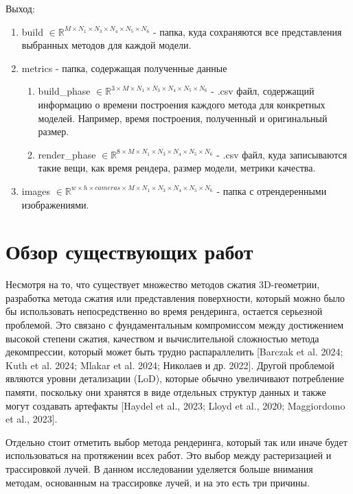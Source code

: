 \documentclass[a4paper,hidelinks,12pt]{article}
\begin{document}
Выход:
\par
\begin{enumerate}
	\item build $\in \mathbb{R}^{M \times N_1 \times N_3 \times N_4 \times N_5 \times N_6}$ - папка, куда сохраняются все представления выбранных методов для каждой модели.
	\item metrics - папка, содержащая полученные данные
	\begin{enumerate}
		\item build\_phase $\in \mathbb{R}^{3 \times M \times N_1 \times N_3 \times N_4 \times N_5 \times N_6}$ - .csv файл, содержащий информацию о времени построения каждого 
		метода для конкретных моделей. Например, время построения, полученный и оригинальный размер.
		\item render\_phase $\in \mathbb{R}^{8 \times M \times N_1 \times N_3 \times N_4 \times N_5 \times N_6}$ - .csv файл, куда записываются такие вещи, как время рендера, размер модели, метрики качества.
	\end{enumerate} 
	\item images $\in \mathbb{R}^{w \times h \times cameras \times M \times N_1 \times N_3 \times N_4 \times N_5 \times N_6}$ - папка с отрендеренными изображениями.
\end{enumerate}

\newpage

\section{Обзор существующих работ}

Несмотря на то, что существует множество методов сжатия 3D-геометрии, разработка метода сжатия или представления 
поверхности, который можно было бы использовать непосредственно во время рендеринга, остается серьезной проблемой. 
Это связано с фундаментальным компромиссом между достижением высокой степени сжатия, качеством и вычислительной сложностью 
метода декомпрессии, который может быть трудно распараллелить [Barczak et al. 2024; Kuth et al. 2024; Mlakar et al. 2024; Николаев и др. 2022]. 
Другой проблемой являются уровни детализации (LoD), которые обычно увеличивают потребление памяти, поскольку они хранятся в виде отдельных 
структур данных и также могут создавать артефакты [Haydel et al., 2023; Lloyd et al., 2020; Maggiordomo et al., 2023]. 

Отдельно стоит отметить выбор метода рендеринга, который так или иначе будет использоваться на протяжении всех работ. 
Это выбор между растеризацией и трассировкой лучей. В данном исследовании уделяется больше внимания методам, основанным 
на трассировке лучей, и на это есть три причины.
\end{document}
